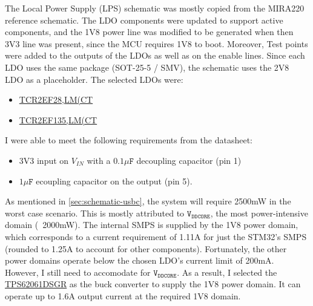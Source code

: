The Local Power Supply (LPS) schematic was mostly copied from the MIRA220 reference schematic. The LDO components were updated to support active components, and the 1V8 power line was modified to be generated when then 3V3 line was present, since the MCU requires 1V8 to boot.
Moreover, 
Test points were added to the outputs of the LDOs as well as on the enable lines. Since each LDO uses the same package (SOT-25-5 / SMV), the schematic uses the 2V8 LDO as a placeholder.
The selected LDOs were:
\begin{itemize}
    \item \href{https://au.mouser.com/ProductDetail/Toshiba/TCR2EF28LMCT?qs=cW4DzVrAanOy43sfBSrpyQ%3D%3D}{TCR2EF28,LM(CT}
    \item \href{https://au.mouser.com/ProductDetail/Toshiba/TCR2EF135LMCT?qs=bZr6mbWTK5l0uINCghoB7g%3D%3D}{TCR2EF135,LM(CT}
\end{itemize}
I were able to meet the following requirements from the datasheet:
\begin{itemize}
    \item 3V3 input on $V_{IN}$ with a $0.1\mu\texttt{F}$ decoupling capacitor (pin 1)
    \item $1\mu\texttt{F}$ ecoupling capacitor on the output (pin 5).
\end{itemize}
As mentioned in \autoref{sec:schematic-usbc}, the system will require 2500mW in the worst case scenario. This is mostly attributed to $\texttt{V}_{\texttt{DDCORE}}$, the most power-intensive domain (~2000mW). The internal SMPS is supplied by the 1V8 power domain, which corresponds to a current requirement of 1.11A for just the STM32's SMPS (rounded to 1.25A to account for other components).
Fortunately, the other power domains operate below the chosen LDO's current limit of 200mA. However, I still need to accomodate for $\texttt{V}_{\texttt{DDCORE}}$.
As a result, I selected the \href{https://au.mouser.com/ProductDetail/Texas-Instruments/TPS62061DSGR?qs=sGAEpiMZZMvAX9OfPh%252B2NTd%2Fl77i5i6T9vQ1%2FEkgUpA%3D}{TPS62061DSGR} as the buck converter to supply the 1V8 power domain. It can operate up to 1.6A output current at the required 1V8 domain.